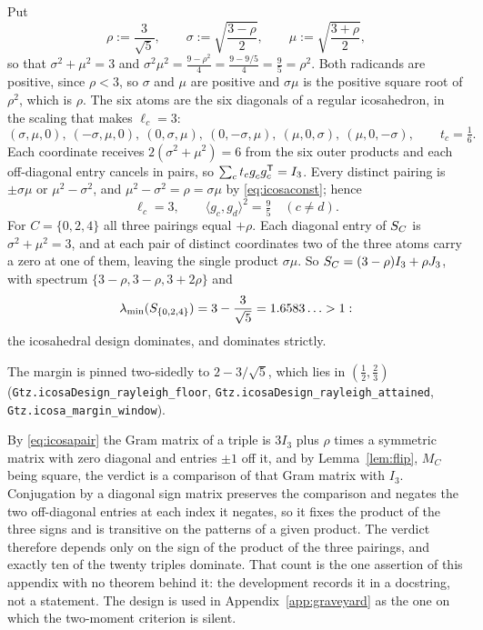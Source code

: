 Put
\begin{equation}\label{eq:icosaconst}
  \rho:=\frac{3}{\sqrt5},\qquad
  \sigma:=\sqrt{\frac{3-\rho}{2}},\qquad
  \mu:=\sqrt{\frac{3+\rho}{2}},
\end{equation}
so that $\sigma^2+\mu^2=3$ and
$\sigma^2\mu^2=\tfrac{9-\rho^2}{4}=\tfrac{9-9/5}{4}=\tfrac95=\rho^2$.  Both
radicands are positive, since $\rho<3$, so $\sigma$ and $\mu$ are positive
and $\sigma\mu$ is the positive square root of $\rho^2$, which is $\rho$.
The six atoms are the six diagonals of a regular icosahedron, in the
scaling that makes $\ell_c=3$:
\[
  (\sigma,\mu,0),\ (-\sigma,\mu,0),\
  (0,\sigma,\mu),\ (0,-\sigma,\mu),\
  (\mu,0,\sigma),\ (\mu,0,-\sigma),
  \qquad t_c=\tfrac16 .
\]
Each coordinate receives $2(\sigma^2+\mu^2)=6$ from the six outer products and
each off-diagonal entry cancels in pairs, so
$\sum_c t_c g_c^{\vphantom{\mathsf{T}}}g_c\tp=I_3$.  Every distinct pairing is
$\pm\sigma\mu$ or $\mu^2-\sigma^2$, and $\mu^2-\sigma^2=\rho=\sigma\mu$ by
\eqref{eq:icosaconst}; hence
\begin{equation}\label{eq:icosapair}
  \ell_c=3,\qquad \langle g_c,g_d\rangle^2=\tfrac95 \quad(c\ne d).
\end{equation}
For $C=\{0,2,4\}$ all three pairings equal $+\rho$.  Each diagonal entry of
$S_{C}$ is $\sigma^2+\mu^2=3$, and at each pair of distinct coordinates two of
the three atoms carry a zero at one of them, leaving the single product
$\sigma\mu$.  So $S_{C}=(3-\rho)I_3+\rho J_3$, with spectrum
$\{3-\rho,3-\rho,3+2\rho\}$ and
\[
  \lambda_{\min}(S_{\{0,2,4\}})=3-\frac{3}{\sqrt5}=1.6583\ldots>1 :
\]
the icosahedral design dominates, and dominates strictly.

\begin{sloppypar}
The margin is pinned two-sidedly to $2-3/\sqrt5$, which lies in
$(\tfrac12,\tfrac23)$
(\texttt{Gtz.icosa\allowbreak Design\_\allowbreak rayleigh\_\allowbreak floor},
\texttt{Gtz.icosa\allowbreak Design\_\allowbreak rayleigh\_\allowbreak attained},
\texttt{Gtz.icosa\_\allowbreak margin\_\allowbreak window}).
\end{sloppypar}

By \eqref{eq:icosapair} the Gram matrix of a triple is $3I_3$ plus $\rho$
times a symmetric matrix with zero diagonal and entries $\pm1$ off it, and
by Lemma~\ref{lem:flip}, $M_C$ being square, the verdict is a comparison of
that Gram matrix with $I_3$.  Conjugation by a diagonal sign matrix
preserves the comparison and negates the two off-diagonal entries at each
index it negates, so it fixes the product of the three signs and is
transitive on the patterns of a given product.  The verdict therefore depends only on the sign
of the product of the three pairings, and exactly ten of the twenty triples
dominate.  That count is the one assertion of this
appendix with no theorem behind it: the development records it in a
docstring, not a statement.  The design is used in
Appendix~\ref{app:graveyard} as the one on which the two-moment criterion is
silent.

